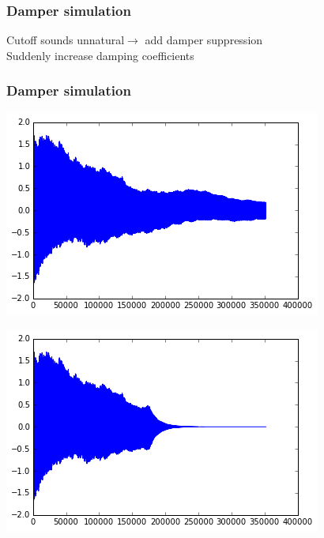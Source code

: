 \documentclass{beamer}
\begin{document}
\begin{frame}\frametitle{Damper simulation}
Cutoff sounds unnatural$\rightarrow$ add damper suppression\\
Suddenly increase damping coefficients
\end{frame}

\begin{frame}\frametitle{Damper simulation}

    \begin{minipage}{0.47\textwidth}
		\includegraphics[width=\textwidth]{images/normal.png}
	\end{minipage}
    \begin{minipage}{0.47\textwidth}
		\includegraphics[width=\textwidth]{images/damped.png}
	\end{minipage}
\end{frame}
\end{document}
